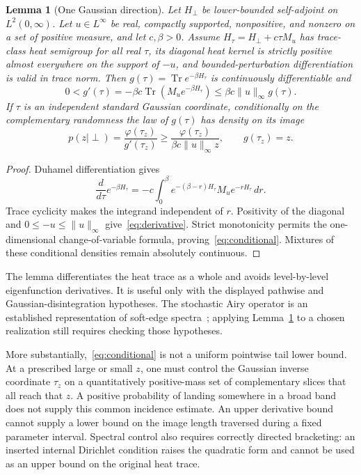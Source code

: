 \documentclass[11pt,a4paper]{article}
\newtheorem{lemma}[theorem]{Lemma}
\theoremstyle{remark}\newtheorem{remark}[theorem]{Remark}
\newcommand{\Tr}{\operatorname{Tr}}
\begin{document}
\begin{lemma}[One Gaussian direction]\label{lem:semigroup}
Let $H_\perp$ be lower-bounded self-adjoint on $L^2(0,\infty)$.
Let $u\in L^\infty$ be real, compactly supported, nonpositive, and nonzero on a set of positive measure, and let $c,\beta>0$.
Assume $H_\tau=H_\perp+c\tau M_u$ has trace-class heat semigroup for all real $\tau$, its diagonal heat kernel is strictly positive almost everywhere on the support of $-u$, and bounded-perturbation differentiation is valid in trace norm.
Then $g(\tau)=\Tr e^{-\beta H_\tau}$ is continuously differentiable and
\begin{equation}\label{eq:derivative}
 0<g'(\tau)=-\beta c\Tr(M_u e^{-\beta H_\tau})
 \le\beta c\|u\|_\infty g(\tau).
\end{equation}
If $\tau$ is an independent standard Gaussian coordinate, conditionally on the complementary randomness the law of $g(\tau)$ has density on its image
\begin{equation}\label{eq:conditional}
 p(z\mid\perp)=\frac{\varphi(\tau_z)}{g'(\tau_z)}
 \ge\frac{\varphi(\tau_z)}{\beta c\|u\|_\infty z},\qquad g(\tau_z)=z.
\end{equation}
\end{lemma}
\begin{proof}
Duhamel differentiation gives
\begin{equation}
 \frac{d}{d\tau}e^{-\beta H_\tau}
 =-c\int_0^\beta e^{-(\beta-r)H_\tau}M_u e^{-rH_\tau}\,dr.
\end{equation}
Trace cyclicity makes the integrand independent of $r$.
Positivity of the diagonal and $0\le-u\le\|u\|_\infty$ give~\eqref{eq:derivative}.
Strict monotonicity permits the one-dimensional change-of-variable formula, proving~\eqref{eq:conditional}.
Mixtures of these conditional densities remain absolutely continuous.
\end{proof}

The lemma differentiates the heat trace as a whole and avoids level-by-level eigenfunction derivatives.
It is useful only with the displayed pathwise and Gaussian-disintegration hypotheses.
The stochastic Airy operator is an established representation of soft-edge spectra~\citep{RamirezRiderVirag2011}; applying Lemma~\ref{lem:semigroup} to a chosen realization still requires checking those hypotheses.

More substantially,~\eqref{eq:conditional} is not a uniform pointwise tail lower bound.
At a prescribed large or small $z$, one must control the Gaussian inverse coordinate $\tau_z$ on a quantitatively positive-mass set of complementary slices that all reach that $z$.
A positive probability of landing somewhere in a broad band does not supply this common incidence estimate.
An upper derivative bound cannot supply a lower bound on the image length traversed during a fixed parameter interval.
Spectral control also requires correctly directed bracketing: an inserted internal Dirichlet condition raises the quadratic form and cannot be used as an upper bound on the original heat trace.
\end{document}
